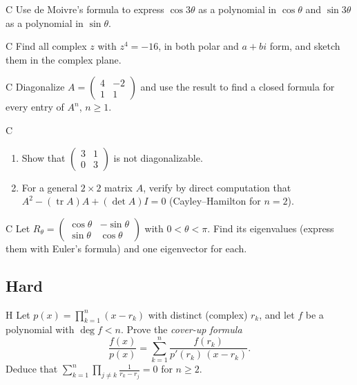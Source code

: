 \begin{problem}{C}\label{prob:ch00-c4}
Use de Moivre's formula to express $\cos 3\theta$ as a polynomial in
$\cos\theta$ and $\sin 3\theta$ as a polynomial in $\sin\theta$.
\end{problem}

\begin{problem}{C}\label{prob:ch00-c5}
Find all complex $z$ with $z^4 = -16$, in both polar and $a+bi$ form, and
sketch them in the complex plane.
\end{problem}

\begin{problem}{C}\label{prob:ch00-c6}
Diagonalize $A = \begin{pmatrix}4&-2\\1&1\end{pmatrix}$ and use the result to
find a closed formula for every entry of $A^n$, $n\ge 1$.
\end{problem}

\begin{problem}{C}\label{prob:ch00-c7}
\begin{enumerate}[label=(\alph*)]
  \item Show that $\begin{pmatrix}3&1\\0&3\end{pmatrix}$ is not diagonalizable.
  \item For a general $2\times2$ matrix $A$, verify by direct computation that
        $A^2 - (\operatorname{tr}A)A + (\det A)I = 0$ (Cayley--Hamilton for
        $n=2$).
\end{enumerate}
\end{problem}

\begin{problem}{C}\label{prob:ch00-c8}
Let $R_\theta = \begin{pmatrix}\cos\theta&-\sin\theta\\\sin\theta&\cos\theta\end{pmatrix}$
with $0<\theta<\pi$. Find its eigenvalues (express them with Euler's formula)
and one eigenvector for each.
\end{problem}

\subsection*{Hard}

\begin{problem}{H}\label{prob:ch00-h1}
Let $p(x) = \prod_{k=1}^{n}(x - r_k)$ with distinct (complex) $r_k$, and let
$f$ be a polynomial with $\deg f < n$. Prove the \emph{cover-up formula}
\[
  \frac{f(x)}{p(x)} = \sum_{k=1}^{n}\frac{f(r_k)}{p'(r_k)\,(x - r_k)}.
\]
Deduce that $\displaystyle\sum_{k=1}^{n}\prod_{j\neq k}\frac{1}{r_k - r_j} = 0$
for $n\ge 2$.
\end{problem}

